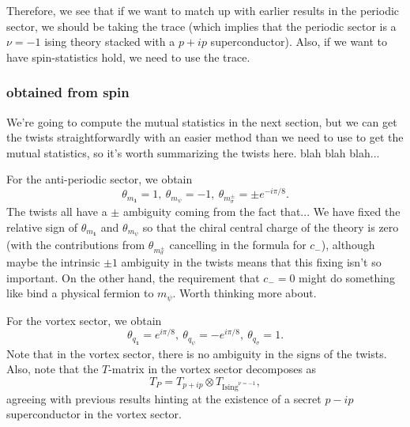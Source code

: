 \documentclass[12pt,a4paper]{article}
\newcommand{\tp}{\otimes}
\newcommand{\unit}{\mathbf{1}}
\newcommand\be            {\begin{equation}}
\newcommand\ee            {\end{equation}}
\begin{document}
Therefore, we see that if we want to match up with earlier results in the periodic sector, we should be taking the trace (which implies that the periodic sector is a $\nu = -1$ ising theory stacked with a $p+ip$ superconductor). Also, if we want to have spin-statistics hold, we need to use the trace. 

\subsubsection{obtained from spin}
We're going to compute the mutual statistics in the next section, but we can get the twists straightforwardly with an easier method than we need to use to get the mutual statistics, so it's worth summarizing the twists here. blah blah blah...

For the anti-periodic sector, we obtain 
\be \theta_{m_\unit} = 1,\ \theta_{m_\psi} = -1,\ \theta_{m^\pm_\sigma} = \pm e^{-i\pi/8}.\ee
The twists all have a $\pm$ ambiguity coming from the fact that...
We have fixed the relative sign of $\theta_{m_\unit}$ and $\theta_{m_\psi}$ so that the chiral central charge of the theory is zero (with the contributions from $\theta_{m_\sigma^\pm}$ cancelling in the formula for $c_-$), although maybe the intrinsic $\pm1$ ambiguity in the twists means that this fixing isn't so important. On the other hand, the requirement that $c_-=0$ might do something like bind a physical fermion to $m_\psi$. Worth thinking more about. 

For the vortex sector, we obtain 
\be \theta_{q_\unit} = e^{i\pi/8},\ \theta_{q_\psi} = -e^{i\pi/8},\ \theta_{q_\sigma} = 1.\ee
Note that in the vortex sector, there is no ambiguity in the signs of the twists. Also, note that the $T$-matrix in the vortex sector decomposes as 
\be T_P = T_{p+ip} \tp T_{\text{Ising}^{\nu = -1}},\ee
agreeing with previous results hinting at the existence of a secret $p-ip$ superconductor in the vortex sector. 
\end{document}
